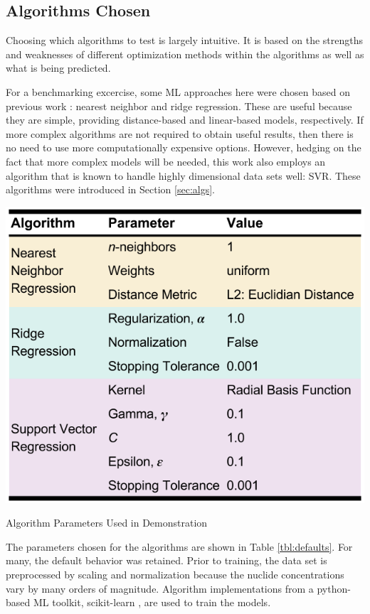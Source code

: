 \subsection{Algorithms Chosen}
\label{sec:choice}

Choosing which algorithms to test is largely intuitive. It is based on the
strengths and weaknesses of different optimization methods within the
algorithms as well as what is being predicted.  

For a benchmarking excercise, some \gls{ML} approaches here were chosen
based on previous work \cite{dayman_feasibility_2013}: nearest neighbor and
ridge regression. These are useful because they are simple, providing
distance-based and linear-based models, respectively. If more complex
algorithms are not required to obtain useful results, then there is no need to
use more computationally expensive options. However, hedging on the fact that
more complex models will be needed, this work also employs an algorithm that is
known to handle highly dimensional data sets well: \acrfull{SVR}.
These algorithms were introduced in Section \ref{sec:algs}. 

\begin{table}[!htb]
  \centering
  \includegraphics[width=0.8\linewidth]{./chapters/demo_method/defaults.png}
  \caption{Algorithm Parameters Used in Demonstration}
  \label{tbl:defaults}
\end{table}

The parameters chosen for the algorithms are shown in Table \ref{tbl:defaults}.
For many, the default behavior was retained. Prior to training, the data set is
preprocessed by scaling and normalization because the nuclide concentrations
vary by many orders of magnitude. Algorithm implementations from a python-based
\gls{ML} toolkit, scikit-learn \cite{scikit}, are used to train the
models.

